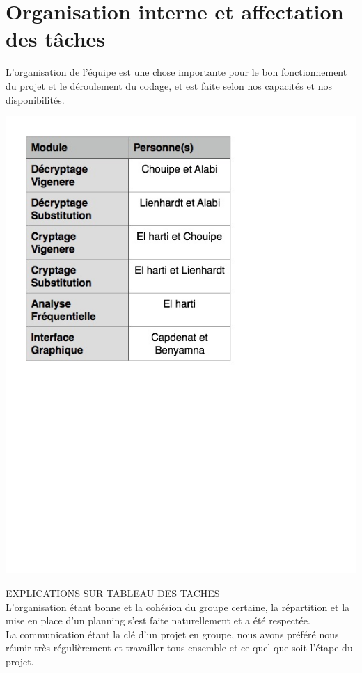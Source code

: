 \documentclass[a4]{article}
\begin{document}
	\section{Organisation interne et affectation des tâches}
	L'organisation de l'équipe est une chose importante pour le bon fonctionnement du
  projet et le déroulement du codage, et est faite selon nos capacités et nos disponibilités.  \\ 
		 \begin{center}\includegraphics[scale=0.5]{tableau_tache_final.jpg}\end{center}
		 EXPLICATIONS SUR TABLEAU DES TACHES \\ 
		
		L'organisation étant bonne et la cohésion du groupe certaine, la répartition et la mise en place d'un planning 
		s'est faite naturellement et a été respectée.  \\
		La communication étant la clé d'un projet en groupe, nous avons préféré
		nous réunir très régulièrement et travailler tous ensemble et ce quel que soit l'étape du projet.
\end{document}
